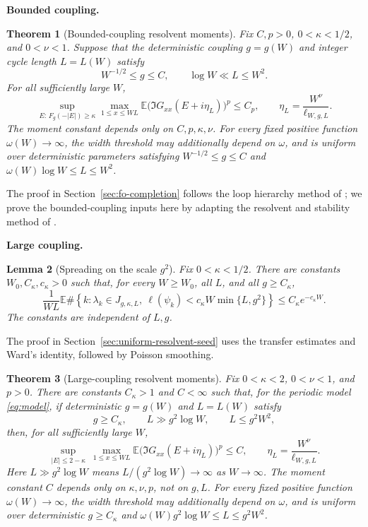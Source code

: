 \documentclass[11pt]{article}
\numberwithin{equation}{section}
\newtheorem{theorem}{Theorem}[section]
\newtheorem{lemma}[theorem]{Lemma}
\theoremstyle{remark}
\newcommand{\E}{\mathbb E}
\newcommand{\ellstar}{\ell_{W,g,L}}
\begin{document}
\medskip\noindent\textbf{Bounded coupling.}
\begin{theorem}[Bounded-coupling resolvent moments]
\label{thm:bounded-lower}
Fix $C,p>0$, $0<\kappa<1/2$, and $0<\nu<1$.
Suppose that the deterministic coupling $g=g(W)$ and integer cycle
length $L=L(W)$ satisfy
\begin{equation}\label{eq:bounded-lower-range}
 W^{-1/2}\le g\le C,\qquad \log W\ll L\le W^2.
\end{equation}
For all sufficiently large $W$,
\begin{equation}\label{eq:bounded-lower-moment}
 \sup_{E:\,F_g(-|E|)\ge\kappa}\max_{1\le x\le WL}
 \E\bigl(\Im G_{xx}(E+i\eta_L)\bigr)^p\le C_p,
 \qquad \eta_L=\frac{W^\nu}{\ellstar}.
\end{equation}
The moment constant depends only on $C,p,\kappa,\nu$.
For every fixed positive function $\omega(W)\to\infty$, the width threshold
may additionally depend on $\omega$, and is uniform over deterministic
parameters satisfying $W^{-1/2}\le g\le C$ and
$\omega(W)\log W\le L\le W^2$.
\end{theorem}
The proof in Section~\ref{sec:fo-completion} follows the loop hierarchy
method of \cite{TYY}; we prove the bounded-coupling inputs here by adapting
the resolvent and stability method of
\cite[Section~8 and Appendix~B.1]{DYYY}.

 
\medskip\noindent\textbf{Large coupling.}
\begin{lemma}[Spreading on the scale $g^2$]\label{uv:lem:short-spreading}
Fix $0<\kappa<1/2$. There are constants $W_0,C_\kappa,c_\kappa>0$
such that, for every $W\ge W_0$, all $L$, and all $g\ge C_\kappa$,
\begin{equation}\label{uv:eq:constant-scattering-outline}
 \frac1{WL}\E\#\left\{k:\lambda_k\in J_{g,\kappa,L},\
   \ell(\psi_k)<c_\kappa W\min\{L,g^2\}\right\}
 \le C_\kappa e^{-c_\kappa W}.
\end{equation}
The constants are independent of $L,g$.
\end{lemma}
The proof in Section~\ref{sec:uniform-resolvent-seed} uses the transfer
estimates and Ward's identity, followed by Poisson smoothing.

\begin{theorem}[Large-coupling resolvent moments]
\label{uvu:thm:terminal}
Fix $0<\kappa<2$, $0<\nu<1$, and $p>0$.
There are constants $C_\kappa>1$ and $C<\infty$ such that, for the periodic
model \eqref{eq:model}, if deterministic $g=g(W)$ and $L=L(W)$ satisfy
\[
 g\ge C_\kappa,\qquad L\gg g^2\log W,\qquad L\le g^2W^2,
\]
then, for all sufficiently large $W$,
\begin{equation}\label{uvu:eq:local-moments}
 \sup_{|E|\le2-\kappa}\ \max_{1\le x\le WL}
 \E\bigl(\Im G_{xx}(E+i\eta_L)\bigr)^p\le C,
 \qquad \eta_L=\frac{W^\nu}{\ellstar}.
\end{equation}
Here $L\gg g^2\log W$ means $L/(g^2\log W)\to\infty$ as $W\to\infty$.
The moment constant $C$ depends only on $\kappa,\nu,p$, not on $g,L$.
For every fixed positive function $\omega(W)\to\infty$, the width threshold
may additionally depend on $\omega$, and is uniform over deterministic
$g\ge C_\kappa$ and $\omega(W)g^2\log W\le L\le g^2W^2$.
\end{theorem}
\end{document}

